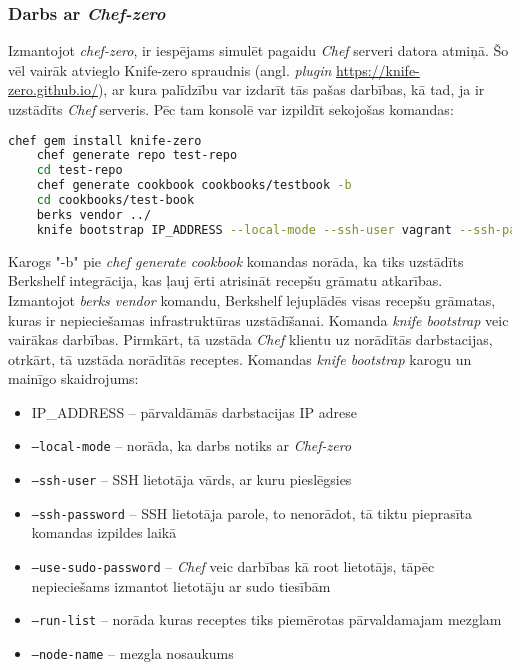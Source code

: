 \subsubsection{Darbs ar \textit{Chef-zero} }
Izmantojot \textit{chef-zero}, ir iespējams simulēt pagaidu \textit{Chef} serveri datora atmiņā. Šo vēl vairāk atvieglo Knife-zero spraudnis (angl. \textit{plugin} \url{https://knife-zero.github.io/}), ar kura palīdzību var izdarīt tās pašas darbības, kā tad, ja ir uzstādīts \textit{Chef} serveris.
Pēc tam konsolē var izpildīt sekojošas komandas:
\begin{lstlisting}[language=bash]
	chef gem install knife-zero
	chef generate repo test-repo
	cd test-repo
	chef generate cookbook cookbooks/testbook -b
	cd cookbooks/test-book
	berks vendor ../
	knife bootstrap IP_ADDRESS --local-mode --ssh-user vagrant --ssh-password 'vagrant' --sudo --use-sudo-password --run-list 'recipe[testbook]' --node-name chefnode
\end{lstlisting}
Karogs "-b" pie \textit{chef generate cookbook} komandas norāda, ka tiks uzstādīts Berkshelf integrācija, kas ļauj ērti atrisināt recepšu grāmatu atkarības.
Izmantojot \textit{berks vendor} komandu, Berkshelf lejuplādēs visas recepšu grāmatas, kuras ir nepieciešamas infrastruktūras uzstādīšanai.
Komanda \textit{knife bootstrap} veic vairākas darbības. Pirmkārt, tā uzstāda \textit{Chef} klientu uz norādītās darbstacijas, otrkārt, tā uzstāda norādītās receptes.
Komandas \textit{knife bootstrap} karogu un mainīgo skaidrojums:
\begin{itemize}
	\item IP_ADDRESS -- pārvaldāmās darbstacijas IP adrese
	\item \texttt{--local-mode} -- norāda, ka darbs notiks ar \textit{Chef-zero}
	\item \texttt{--ssh-user} -- SSH lietotāja vārds, ar kuru pieslēgsies
	\item \texttt{--ssh-password} -- SSH lietotāja parole, to nenorādot, tā tiktu pieprasīta komandas izpildes laikā
	\item \texttt{--use-sudo-password} -- \textit{Chef} veic darbības kā root lietotājs, tāpēc nepieciešams izmantot lietotāju ar sudo tiesībām
	\item \texttt{--run-list} -- norāda kuras receptes tiks piemērotas pārvaldamajam mezglam
	\item \texttt{--node-name} -- mezgla nosaukums
\end{itemize}


